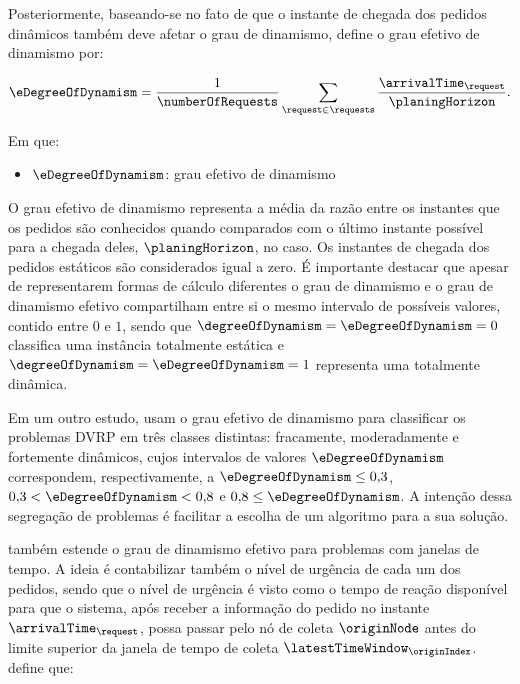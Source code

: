 Posteriormente, baseando-se no fato de que o instante de chegada dos pedidos
dinâmicos também deve afetar o grau de dinamismo,
 define o grau efetivo de dinamismo por:

\begin{equation}
  \eDegreeOfDynamism = 
  \frac{1}{\numberOfRequests}
  \sum_{\request \in \requests}
  {
    \frac{\arrivalTime_\request}{\planingHorizon}
  }.
  \label{eq:eDegreeOfDynamism}
\end{equation}

Em que:
\begin{itemize}
  \item $\eDegreeOfDynamism$: grau efetivo de dinamismo
\end{itemize}

O grau efetivo de dinamismo representa a média da razão entre os instantes que
os pedidos são conhecidos quando comparados com o último instante possível para
a chegada deles, $\planingHorizon$, no caso.
Os instantes de chegada dos pedidos estáticos são considerados igual a zero.
É importante destacar que apesar de representarem formas de cálculo diferentes
o grau de dinamismo e o grau de dinamismo efetivo compartilham entre si o mesmo
intervalo de possíveis valores, contido entre $0$ e $1$, sendo que
$\degreeOfDynamism = \eDegreeOfDynamism = 0$ classifica uma instância
totalmente estática e $\degreeOfDynamism = \eDegreeOfDynamism = 1$ representa
uma totalmente dinâmica.

Em um outro estudo,  usam o grau efetivo
de dinamismo para classificar os problemas DVRP em três classes distintas:
fracamente, moderadamente e fortemente dinâmicos, cujos intervalos de valores 
$\eDegreeOfDynamism$ correspondem, respectivamente, a $\eDegreeOfDynamism \leq
0{,}3$, $0{,}3  < \eDegreeOfDynamism < 0{,}8$ e $0{,}8 \leq
\eDegreeOfDynamism$.
A intenção dessa segregação de problemas é facilitar a escolha de um algoritmo
para a sua solução.

 também estende o grau de dinamismo efetivo
para problemas com janelas de tempo.
A ideia é contabilizar também o nível de urgência de cada um dos pedidos, 
sendo que o nível de urgência é visto como o tempo de reação disponível
para que o sistema, após receber a informação do pedido no instante
$\arrivalTime_\request$, possa passar pelo nó de coleta $\originNode$
antes do limite superior da janela de tempo de coleta
$\latestTimeWindow_{\originIndex}$.
 define que: 

